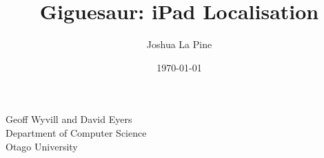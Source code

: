 \documentclass{article}
\title{Giguesaur: iPad Localisation} %
\author{Joshua La Pine} %
\date{\today} %
\begin{document}
\maketitle %

\begin{center}
\large {Geoff Wyvill and David Eyers}\\
\vspace*{1\baselineskip}
Department of Computer Science \\
Otago University \\

\end{center}
\newpage

\tableofcontents
\newpage

\begin{comment}
First pass list of left over comments
- David disagrees with the practicality of a classroom of kids working on a signular puzzle.
- Figure for rvec and tvec in background section. 
- what is localisation -> "Although the figure below doesn't show the orientation of the board as seen by a particular game player."
- maybe come back to the ar section. Put reference in for the uniqueness of giguesaur
- Come back to the section describing the generation of the world-space coordinate vector
- "On the OpenCV Github" -> Wat da faq?
- 
\end{comment}


\end{document}
